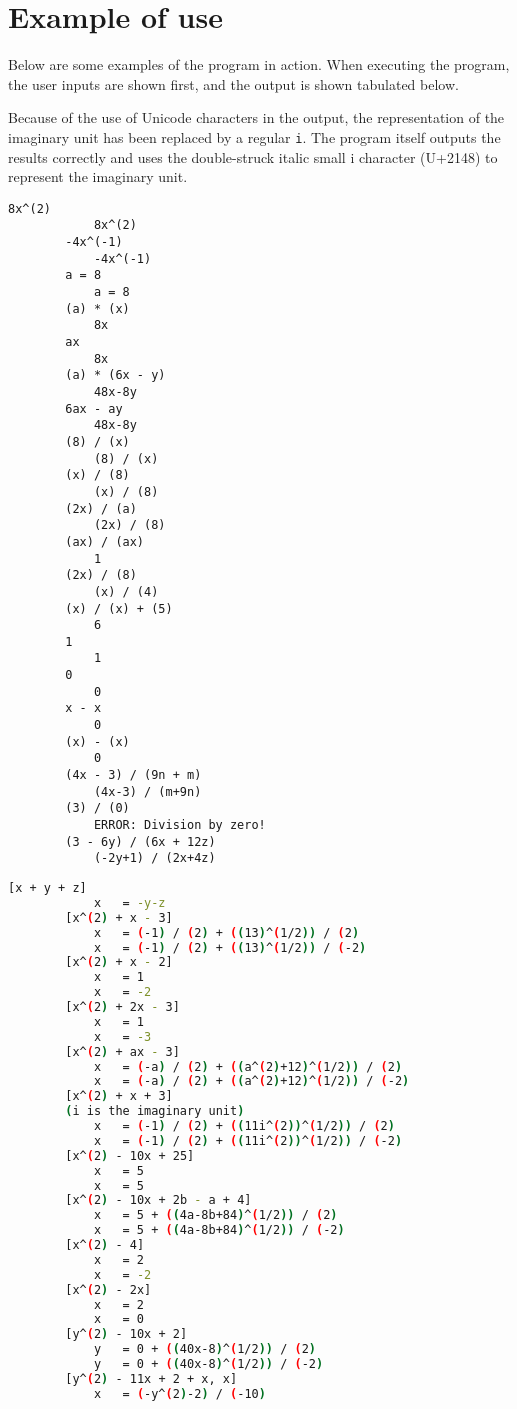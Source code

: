 \section{Example of use}\label{sec:example}
Below are some examples of the program in action. When executing the program, the user inputs are shown first, and the output is shown tabulated below.

Because of the use of Unicode characters in the output, the representation of the imaginary unit has been replaced by a regular \verb|i|. The program itself outputs the results correctly and uses the double-struck italic small i character (U+2148) to represent the imaginary unit.

\begin{minipage}{\linewidth}
    \begin{lstlisting}[caption={Example of use of the program simplifying expressions.},label={lst:example-simplify}]
        8x^(2)
            8x^(2)
        -4x^(-1)
            -4x^(-1)
        a = 8
            a = 8
        (a) * (x)
            8x
        ax
            8x
        (a) * (6x - y)
            48x-8y
        6ax - ay
            48x-8y
        (8) / (x)
            (8) / (x)
        (x) / (8)
            (x) / (8)
        (2x) / (a)
            (2x) / (8)
        (ax) / (ax)
            1
        (2x) / (8)
            (x) / (4)
        (x) / (x) + (5)
            6
        1
            1
        0
            0
        x - x
            0
        (x) - (x)
            0
        (4x - 3) / (9n + m)
            (4x-3) / (m+9n)
        (3) / (0)
            ERROR: Division by zero!
        (3 - 6y) / (6x + 12z)
            (-2y+1) / (2x+4z)
    \end{lstlisting}
\end{minipage}

\begin{minipage}{\linewidth}
    \begin{lstlisting}[language=sh,caption={Example of use of the program evaluating expressions.}, label={lst:example-evaluate}]
        [x + y + z]
            x	= -y-z
        [x^(2) + x - 3]
            x	= (-1) / (2) + ((13)^(1/2)) / (2)
            x	= (-1) / (2) + ((13)^(1/2)) / (-2)
        [x^(2) + x - 2]
            x	= 1
            x	= -2
        [x^(2) + 2x - 3]
            x	= 1
            x	= -3
        [x^(2) + ax - 3]
            x	= (-a) / (2) + ((a^(2)+12)^(1/2)) / (2)
            x	= (-a) / (2) + ((a^(2)+12)^(1/2)) / (-2)
        [x^(2) + x + 3]
        (i is the imaginary unit)
            x	= (-1) / (2) + ((11i^(2))^(1/2)) / (2)
            x	= (-1) / (2) + ((11i^(2))^(1/2)) / (-2)
        [x^(2) - 10x + 25]
            x	= 5
            x	= 5
        [x^(2) - 10x + 2b - a + 4]
            x	= 5 + ((4a-8b+84)^(1/2)) / (2)
            x	= 5 + ((4a-8b+84)^(1/2)) / (-2)
        [x^(2) - 4]
            x	= 2
            x	= -2
        [x^(2) - 2x]
            x	= 2
            x	= 0
        [y^(2) - 10x + 2]
            y	= 0 + ((40x-8)^(1/2)) / (2)
            y	= 0 + ((40x-8)^(1/2)) / (-2)
        [y^(2) - 11x + 2 + x, x]
            x	= (-y^(2)-2) / (-10)
    \end{lstlisting}
\end{minipage}
